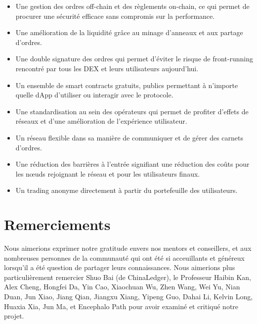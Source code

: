 \documentclass[UTF8,nofonts]{article}
\begin{document}
\begin{multicols}{2}
\begin{itemize}
	\item Une gestion des ordres off-chain et des règlements on-chain, ce qui permet de procurer une sécurité efficace sans compromis sur la performance.
	\item Une amélioration de la liquidité grâce au minage d'anneaux et aux partage d'ordres.
	\item Une double signature des ordres qui permet d'éviter le risque de front-running rencontré par tous les DEX et leurs utilisateurs aujourd'hui.
	\item Un ensemble de smart contracts gratuits, publics permettant à n'importe quelle dApp d'utiliser ou interagir avec le protocole.
	\item Une standardisation au sein des opérateurs qui permet de profiter d'effets de réseaux et d'une amélioration de l'expérience utilisateur.
	\item Un réseau flexible dans sa manière de communiquer et de gérer des carnets d'ordres.
	\item Une réduction des barrières à l'entrée signifiant une réduction des coûts pour les nœuds rejoignant le réseau et pour les utilisateurs finaux.
	\item Un trading anonyme directement à partir du portefeuille des utilisateurs.
\end{itemize}

\section{Remerciements}
Nous aimerions exprimer notre gratitude envers nos mentors et conseillers, et aux nombreuses personnes de la communauté qui ont été si acceuillants et généreux lorsqu'il a été question de partager leurs connaissances. Nous aimerions plus particulièrement remercier Shuo Bai (de ChinaLedger), le Professeur Haibin Kan, Alex Cheng, Hongfei Da, Yin Cao, Xiaochuan Wu, Zhen Wang, Wei Yu, Nian Duan, Jun Xiao, Jiang Qian, Jiangxu Xiang, Yipeng Guo, Dahai Li, Kelvin Long, Huaxia Xia, Jun Ma, et Encephalo Path pour avoir examiné et critiqué notre projet.  






\end{multicols}
\end{document}
